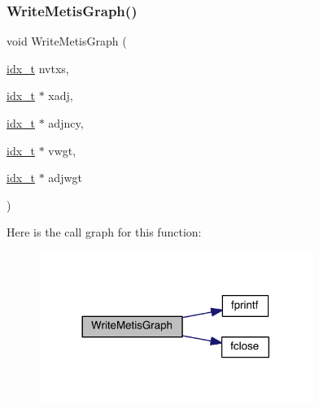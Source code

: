 \subsubsection{\texorpdfstring{Write\+Metis\+Graph()}{WriteMetisGraph()}}
{\footnotesize\ttfamily void Write\+Metis\+Graph (\begin{DoxyParamCaption}\item[{\hyperlink{a00876_aaa5262be3e700770163401acb0150f52}{idx\+\_\+t}}]{nvtxs,  }\item[{\hyperlink{a00876_aaa5262be3e700770163401acb0150f52}{idx\+\_\+t} $\ast$}]{xadj,  }\item[{\hyperlink{a00876_aaa5262be3e700770163401acb0150f52}{idx\+\_\+t} $\ast$}]{adjncy,  }\item[{\hyperlink{a00876_aaa5262be3e700770163401acb0150f52}{idx\+\_\+t} $\ast$}]{vwgt,  }\item[{\hyperlink{a00876_aaa5262be3e700770163401acb0150f52}{idx\+\_\+t} $\ast$}]{adjwgt }\end{DoxyParamCaption})}

Here is the call graph for this function\+:\nopagebreak
\begin{figure}[H]
\begin{center}
\leavevmode
\includegraphics[width=252pt]{a00885_a980321d683a314be4d63895acec4a8fc_cgraph}
\end{center}
\end{figure}
